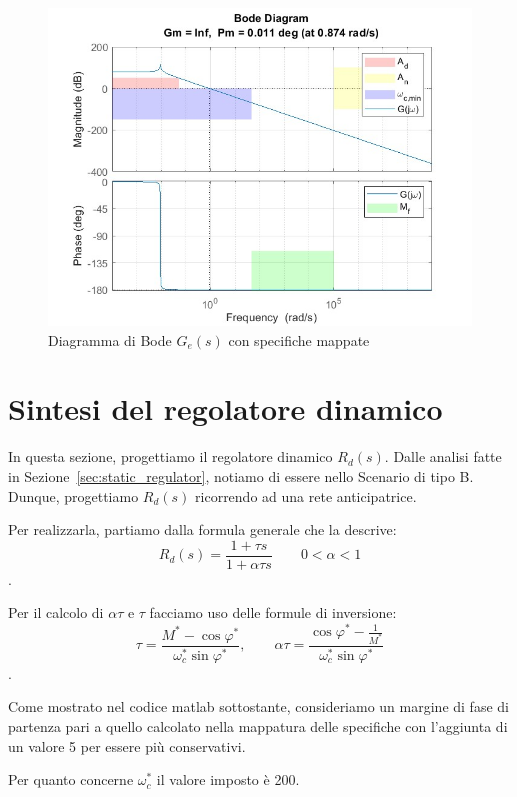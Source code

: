 \documentclass[a4paper, 11pt]{article}
\begin{document}
\begin{figure} [!h]
    \centering
    \includegraphics[scale = 0.45]{Immagini/BODE/bode_Ge.jpg}
    \caption{Diagramma di Bode $G_e(s)$ con specifiche mappate}
    \label{fig:enter-label}
\end{figure}


\section{Sintesi del regolatore dinamico}

In questa sezione, progettiamo il regolatore dinamico $R_d(s)$. 
%
Dalle analisi fatte in Sezione~\ref{sec:static_regulator}, notiamo di essere nello Scenario di tipo B. Dunque, progettiamo $R_d(s)$ ricorrendo ad una rete anticipatrice.

Per realizzarla, partiamo dalla formula generale che la descrive: 
$$R_d(s) = \frac{1+\tau s}{1+\alpha \tau s} \qquad 0 < \alpha < 1$$. 

Per il calcolo di $\alpha \tau$ e $\tau$ facciamo uso delle formule di inversione: 
$$\tau = \frac{M^*-\cos\varphi^*}{\omega_c^*\sin\varphi^*}, \qquad \alpha \tau = \frac{\cos \varphi^* - \frac{1}{M^*}}{\omega_c^*\sin\varphi^*}$$.

Come mostrato nel codice matlab sottostante, consideriamo un margine di fase di partenza pari a quello calcolato nella mappatura delle specifiche con l'aggiunta di un valore 5 per essere più conservativi. 

\vspace{1cm}

Per quanto concerne $\omega_c^*$ il valore imposto è 200.
\end{document}
